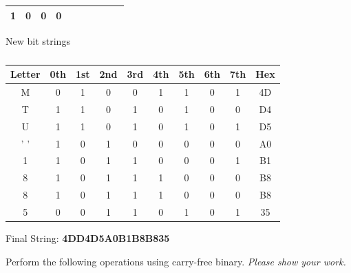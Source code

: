 \documentclass[12pt,addpoints,answers]{exam}
\begin{document}
\begin{questions}
\begin{solution}
\begin{table}[H]
\begin{tabular}{|c|cccccccc|c|}
			\multicolumn{1}{c|}{1} &
			\multicolumn{1}{c|}{0} &
			\multicolumn{1}{c|}{0} &
			0 &
			\\ \hline
		\end{tabular}
	\end{table}
New bit strings
\begin{table}[H]
	\centering
	\caption{}
	\label{tab:my-table}
	\begin{tabular}{|c|cccccccc|c|}
		\hline
		Letter &
		\multicolumn{1}{c|}{0th} &
		\multicolumn{1}{c|}{1st} &
		\multicolumn{1}{c|}{2nd} &
		\multicolumn{1}{c|}{3rd} &
		\multicolumn{1}{c|}{4th} &
		\multicolumn{1}{c|}{5th} &
		\multicolumn{1}{c|}{6th} &
		7th &
		Hex \\ \hline
		M   & 0 & 1 & 0 & 0 & 1 & 1 & 0 & 1 & 4D \\ \cline{1-1} \cline{10-10} 
		T   & 1 & 1 & 0 & 1 & 0 & 1 & 0 & 0 & D4 \\ \cline{1-1} \cline{10-10} 
		U   & 1 & 1 & 0 & 1 & 0 & 1 & 0 & 1 & D5 \\ \cline{1-1} \cline{10-10} 
		' ' & 1 & 0 & 1 & 0 & 0 & 0 & 0 & 0 & A0 \\ \cline{1-1} \cline{10-10} 
		1   & 1 & 0 & 1 & 1 & 0 & 0 & 0 & 1 & B1 \\ \cline{1-1} \cline{10-10} 
		8   & 1 & 0 & 1 & 1 & 1 & 0 & 0 & 0 & B8 \\ \cline{1-1} \cline{10-10} 
		8   & 1 & 0 & 1 & 1 & 1 & 0 & 0 & 0 & B8 \\ \cline{1-1} \cline{10-10} 
		5   & 0 & 0 & 1 & 1 & 0 & 1 & 0 & 1 & 35 \\ \cline{1-1} \cline{10-10} 
	\end{tabular}
\end{table}

Final String: \textbf{4DD4D5A0B1B8B835}
\end{solution}

\question Perform the following operations using carry-free binary. \emph{Please show your work.}
\begin{parts}

\end{parts}
\end{questions}
\end{document}
